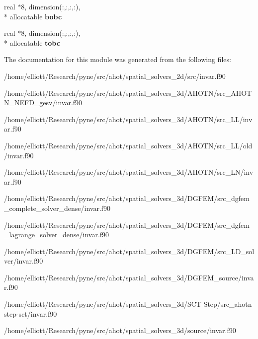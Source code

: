 \begin{DoxyCompactItemize}
\item 
\hypertarget{classinvar_ac88ff3a97a0eccbee288774e812dce01}{real $\ast$8, dimension(\-:,\-:,\-:,\-:), \\*
allocatable {\bfseries bobc}}\label{classinvar_ac88ff3a97a0eccbee288774e812dce01}

\item 
\hypertarget{classinvar_ae61fcd8c1e76af2c5a1700a1beea040e}{real $\ast$8, dimension(\-:,\-:,\-:,\-:), \\*
allocatable {\bfseries tobc}}\label{classinvar_ae61fcd8c1e76af2c5a1700a1beea040e}

\end{DoxyCompactItemize}


The documentation for this module was generated from the following files\-:\begin{DoxyCompactItemize}
\item 
/home/elliott/\-Research/pyne/src/ahot/spatial\-\_\-solvers\-\_\-2d/src/invar.\-f90\item 
/home/elliott/\-Research/pyne/src/ahot/spatial\-\_\-solvers\-\_\-3d/\-A\-H\-O\-T\-N/src\-\_\-\-A\-H\-O\-T\-N\-\_\-\-N\-E\-F\-D\-\_\-gesv/invar.\-f90\item 
/home/elliott/\-Research/pyne/src/ahot/spatial\-\_\-solvers\-\_\-3d/\-A\-H\-O\-T\-N/src\-\_\-\-L\-L/invar.\-f90\item 
/home/elliott/\-Research/pyne/src/ahot/spatial\-\_\-solvers\-\_\-3d/\-A\-H\-O\-T\-N/src\-\_\-\-L\-L/old/invar.\-f90\item 
/home/elliott/\-Research/pyne/src/ahot/spatial\-\_\-solvers\-\_\-3d/\-A\-H\-O\-T\-N/src\-\_\-\-L\-N/invar.\-f90\item 
/home/elliott/\-Research/pyne/src/ahot/spatial\-\_\-solvers\-\_\-3d/\-D\-G\-F\-E\-M/src\-\_\-dgfem\-\_\-complete\-\_\-solver\-\_\-dense/invar.\-f90\item 
/home/elliott/\-Research/pyne/src/ahot/spatial\-\_\-solvers\-\_\-3d/\-D\-G\-F\-E\-M/src\-\_\-dgfem\-\_\-lagrange\-\_\-solver\-\_\-dense/invar.\-f90\item 
/home/elliott/\-Research/pyne/src/ahot/spatial\-\_\-solvers\-\_\-3d/\-D\-G\-F\-E\-M/src\-\_\-\-L\-D\-\_\-solver/invar.\-f90\item 
/home/elliott/\-Research/pyne/src/ahot/spatial\-\_\-solvers\-\_\-3d/\-D\-G\-F\-E\-M\-\_\-source/invar.\-f90\item 
/home/elliott/\-Research/pyne/src/ahot/spatial\-\_\-solvers\-\_\-3d/\-S\-C\-T-\/\-Step/src\-\_\-ahotn-\/step-\/sct/invar.\-f90\item 
/home/elliott/\-Research/pyne/src/ahot/spatial\-\_\-solvers\-\_\-3d/source/invar.\-f90\end{DoxyCompactItemize}
